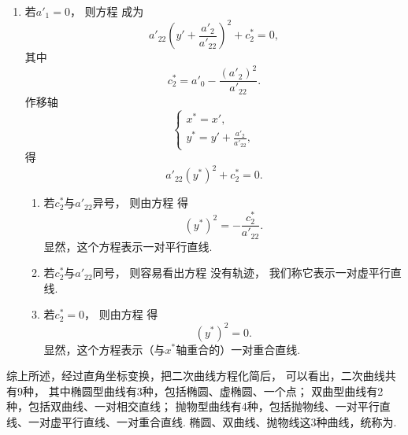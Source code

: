 \begin{enumerate}
\begin{enumerate}
		\item 若\(a'_1 = 0\)，
		则方程 
		成为\begin{equation*}
			a'_{22} \left( y' + \frac{a'_2}{a'_{22}} \right)^2
			+ c^*_2
			= 0,
		\end{equation*}
		其中\begin{equation*}
			c^*_2 = a'_0 - \frac{(a'_2)^2}{a'_{22}}.
		\end{equation*}
		作移轴\begin{equation*}
			\left\{ \begin{array}{l}
				x^* = x', \\
				y^* = y' + \frac{a'_2}{a'_{22}},
			\end{array} \right.
		\end{equation*}
		得\begin{equation}\label{equation:二次曲线方程的化简及其类型.先配方再移轴后所得方程}
			a'_{22} (y^*)^2 + c^*_2 = 0.
		\end{equation}
		\begin{enumerate}
			\item 若\(c^*_2\)与\(a'_{22}\)异号，
			则由方程 
			得\begin{equation*}
				(y^*)^2 = -\frac{c^*_2}{a'_{22}}.
			\end{equation*}
			显然，这个方程表示一对平行直线.

			\item 若\(c^*_2\)与\(a'_{22}\)同号，
			则容易看出方程  没有轨迹，
			我们称它表示一对虚平行直线.

			\item 若\(c^*_2 = 0\)，
			则由方程 
			得\begin{equation*}
				(y^*)^2 = 0.
			\end{equation*}
			显然，这个方程表示（与\(x^*\)轴重合的）一对重合直线.
		\end{enumerate}
	\end{enumerate}
\end{enumerate}
综上所述，经过直角坐标变换，把二次曲线方程化简后，
可以看出，二次曲线共有9种，
其中椭圆型曲线有3种，包括椭圆、虚椭圆、一个点；
双曲型曲线有2种，包括双曲线、一对相交直线；
抛物型曲线有4种，包括抛物线、一对平行直线、一对虚平行直线、一对重合直线.
椭圆、双曲线、抛物线这3种曲线，统称为.
